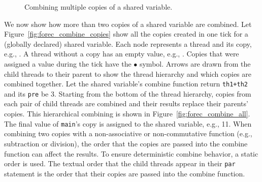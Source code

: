 \begin{figure}
	\centering

	\hspace{1cm}

	\hspace{1cm}
	\caption{Combining multiple copies of a shared variable.}
	\label{fig:forec_combine}
\end{figure}

We now show how more than two copies of a shared
variable are combined. Let Figure~\ref{fig:forec_combine_copies} show all
the copies created in one tick for a (globally declared) shared variable.
Each node represents a thread and its copy, e.g.,
{\setlength{\fboxsep}{2pt}}. A thread without
a copy has an empty value, e.g.,
{\setlength{\fboxsep}{2pt}}. Copies that were
assigned a value during the tick have the $\bullet$ symbol.
Arrows are drawn from the child threads to their parent to
show the thread hierarchy and which copies are combined
together. Let the shared variable's combine function return
\verb$th1+th2$ and its \verb$pre$ be 3. Starting from the
bottom of the thread hierarchy, copies from each pair of
child threads are combined and their results replace
their parents' copies. This hierarchical combining is shown
in Figure~\ref{fig:forec_combine_all}. The final value of
\verb$main$'s copy is assigned to the shared variable, e.g.,
11. When combining two copies with a non-associative or
non-commutative function (e.g., subtraction or division),
the order that the copies are passed into the combine
function can affect the results. To ensure deterministic
combine behavior, a static order is used. The textual order
that the child threads appear in their \verb$par$ statement
is the order that their copies are passed into the combine
function.

